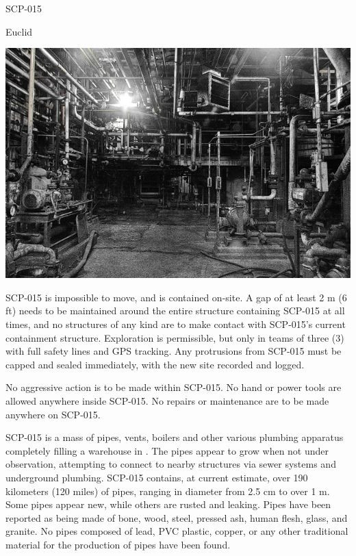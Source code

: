 
 SCP-015

 Euclid

\begin{center}
\includegraphics[scale=0.4]{scp/015.jpg}
\end{center}

 SCP-015 is impossible to move, and is contained on-site. A gap of at least 2 m (6 ft) needs to be maintained around the entire structure containing SCP-015 at all times, and no structures of any kind are to make contact with SCP-015's current containment structure. Exploration is permissible, but only in teams of three (3) with full safety lines and GPS tracking. Any protrusions from SCP-015 must be capped and sealed immediately, with the new site recorded and logged.

No aggressive action is to be made within SCP-015. No hand or power tools are allowed anywhere inside SCP-015. No repairs or maintenance are to be made anywhere on SCP-015.

 SCP-015 is a mass of pipes, vents, boilers and other various plumbing apparatus completely filling a warehouse in . The pipes appear to grow when not under observation, attempting to connect to nearby structures via sewer systems and underground plumbing. SCP-015 contains, at current estimate, over 190 kilometers (120 miles) of pipes, ranging in diameter from 2.5 cm to over 1 m. Some pipes appear new, while others are rusted and leaking. Pipes have been reported as being made of bone, wood, steel, pressed ash, human flesh, glass, and granite. No pipes composed of lead, PVC plastic, copper, or any other traditional material for the production of pipes have been found.

